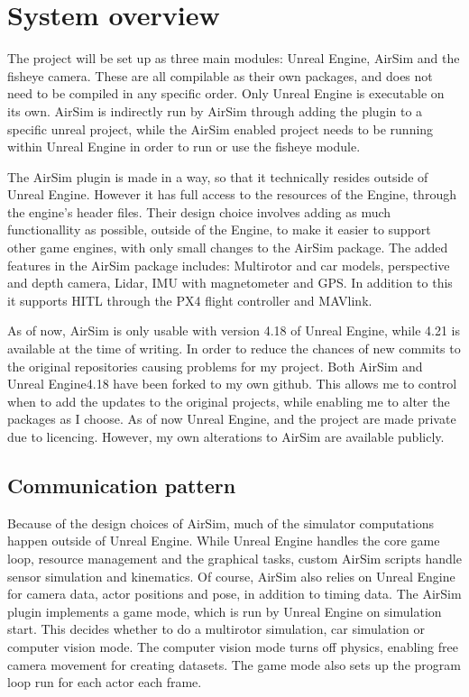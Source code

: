 \section{System overview}

The project will be set up as three main modules: Unreal Engine, AirSim and the fisheye camera. These are all compilable as their own packages, and does not need to be compiled in any specific order. Only Unreal Engine is executable on its own. AirSim is indirectly run by AirSim through adding the plugin to a specific unreal project, while the AirSim enabled project needs to be running within Unreal Engine in order to run or use the fisheye module. 

The AirSim plugin is made in a way, so that it technically resides outside of Unreal Engine. However it has full access to the resources of the Engine, through the engine's header files. Their design choice involves adding as much functionallity as possible, outside of the Engine, to make it easier to support other game engines, with only small changes to the AirSim package. The added features in the AirSim package includes: Multirotor and car models, perspective and depth camera, Lidar, IMU with magnetometer and GPS. In addition to this it supports HITL through the PX4 flight controller and MAVlink. 

As of now, AirSim is only usable with version 4.18 of Unreal Engine, while 4.21 is available at the time of writing. In order to reduce the chances of new commits to the original repositories causing problems for my project. Both AirSim and Unreal Engine4.18 have been forked to my own github. This allows me to control when to add the updates to the original projects, while enabling me to alter the packages as I choose. As of now Unreal Engine, and the project are made private due to licencing. However, my own alterations to AirSim are available publicly.

\subsection{Communication pattern}

Because of the design choices of AirSim, much of the simulator computations happen outside of Unreal Engine. While Unreal Engine handles the core game loop, resource management and the graphical tasks, custom AirSim scripts handle sensor simulation and kinematics. Of course, AirSim also relies on Unreal Engine for camera data, actor positions and pose, in addition to timing data. The AirSim plugin implements a game mode, which is run by Unreal Engine on simulation start. This decides whether to do a multirotor simulation, car simulation or computer vision mode. The computer vision mode turns off physics, enabling free camera movement for creating datasets. The game mode also sets up the program loop run for each actor each frame.

